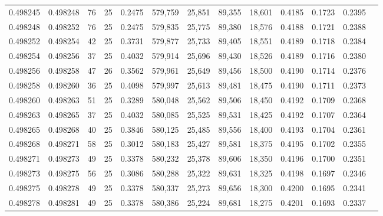 \begin{tabular}{rrrrrrrrrrrrr}
0.498245 & 0.498248 &    76 &  25 &                                     0.2475 & 579,759 &  25,851 &  89,355 &  18,601 & 0.4185 & 0.1723 & 0.2395 \\
0.498248 & 0.498252 &    76 &  25 &                                     0.2475 & 579,835 &  25,775 &  89,380 &  18,576 & 0.4188 & 0.1721 & 0.2388 \\
0.498252 & 0.498254 &    42 &  25 &                                     0.3731 & 579,877 &  25,733 &  89,405 &  18,551 & 0.4189 & 0.1718 & 0.2384 \\
0.498254 & 0.498256 &    37 &  25 &                                     0.4032 & 579,914 &  25,696 &  89,430 &  18,526 & 0.4189 & 0.1716 & 0.2380 \\
0.498256 & 0.498258 &    47 &  26 &                                     0.3562 & 579,961 &  25,649 &  89,456 &  18,500 & 0.4190 & 0.1714 & 0.2376 \\
0.498258 & 0.498260 &    36 &  25 &                                     0.4098 & 579,997 &  25,613 &  89,481 &  18,475 & 0.4190 & 0.1711 & 0.2373 \\
0.498260 & 0.498263 &    51 &  25 &                                     0.3289 & 580,048 &  25,562 &  89,506 &  18,450 & 0.4192 & 0.1709 & 0.2368 \\
0.498263 & 0.498265 &    37 &  25 &                                     0.4032 & 580,085 &  25,525 &  89,531 &  18,425 & 0.4192 & 0.1707 & 0.2364 \\
0.498265 & 0.498268 &    40 &  25 &                                     0.3846 & 580,125 &  25,485 &  89,556 &  18,400 & 0.4193 & 0.1704 & 0.2361 \\
0.498268 & 0.498271 &    58 &  25 &                                     0.3012 & 580,183 &  25,427 &  89,581 &  18,375 & 0.4195 & 0.1702 & 0.2355 \\
0.498271 & 0.498273 &    49 &  25 &                                     0.3378 & 580,232 &  25,378 &  89,606 &  18,350 & 0.4196 & 0.1700 & 0.2351 \\
0.498273 & 0.498275 &    56 &  25 &                                     0.3086 & 580,288 &  25,322 &  89,631 &  18,325 & 0.4198 & 0.1697 & 0.2346 \\
0.498275 & 0.498278 &    49 &  25 &                                     0.3378 & 580,337 &  25,273 &  89,656 &  18,300 & 0.4200 & 0.1695 & 0.2341 \\
0.498278 & 0.498281 &    49 &  25 &                                     0.3378 & 580,386 &  25,224 &  89,681 &  18,275 & 0.4201 & 0.1693 & 0.2337 \\

\end{tabular}
